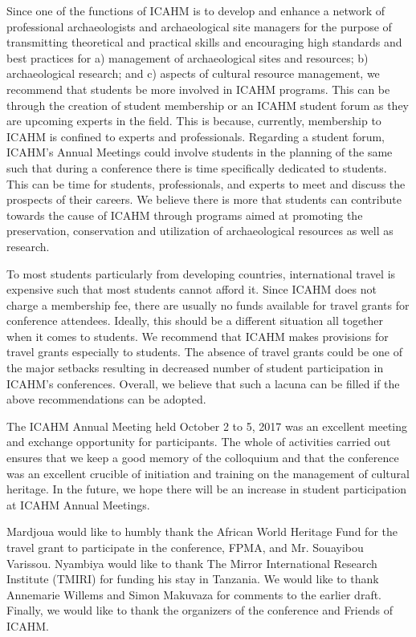 
Since one of the functions of ICAHM is to develop and enhance a network of professional archaeologists and archaeological site managers for the purpose of transmitting theoretical and practical skills and encouraging high standards and best practices for a) management of archaeological sites and resources; b) archaeological research; and c) aspects of cultural resource management, we recommend that students be more involved in ICAHM programs. This can be through the creation of student membership or an ICAHM student forum as they are upcoming experts in the field. This is because, currently, membership to ICAHM is confined to experts and professionals. Regarding a student forum, ICAHM’s Annual Meetings could involve students in the planning of the same such that during a conference there is time specifically dedicated to students. This can be time for students, professionals, and experts to meet and discuss the prospects of their careers. We believe there is more that students can contribute towards the cause of ICAHM through programs aimed at promoting the preservation, conservation and utilization of archaeological resources as well as research.

To most students particularly from developing countries, international travel is expensive such that most students cannot afford it. Since ICAHM does not charge a membership fee, there are usually no funds available for travel grants for conference attendees.  Ideally, this should be a different situation all together when it comes to students. We recommend that ICAHM makes provisions for travel grants especially to students. The absence of travel grants could be one of the major setbacks resulting in decreased number of student participation in ICAHM’s conferences. Overall, we believe that such a lacuna can be filled if the above recommendations can be adopted.


The ICAHM Annual Meeting held October 2 to 5, 2017 was an excellent meeting and exchange opportunity for participants. The whole of activities carried out ensures that we keep a good memory of the colloquium and that the conference was an excellent crucible of initiation and training on the management of cultural heritage. In the future, we hope there will be an increase in student participation at ICAHM Annual Meetings.


Mardjoua would like to humbly thank the African World Heritage Fund for the travel grant to participate in the conference, FPMA, and Mr. Souayibou Varissou. Nyambiya would like to thank The Mirror International Research Institute (TMIRI) for funding his stay in Tanzania. We would like to thank Annemarie Willems and Simon Makuvaza for comments to the earlier draft. Finally, we would like to thank the organizers of the conference and Friends of ICAHM.

\IJSRAclosing%
